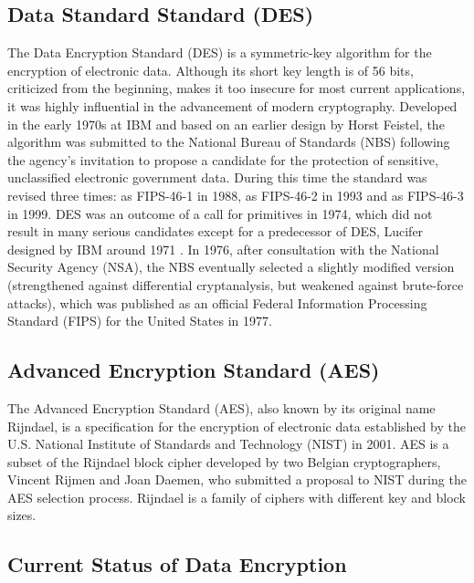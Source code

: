 \documentclass[journal]{IEEEtran}
\begin{document}
\subsection{\textbf{Data Standard Standard (DES)}}
The Data Encryption Standard (DES) is a symmetric-key algorithm for the encryption of electronic data. Although its short key length is of 56 bits, criticized from the beginning, makes it too insecure for most current applications, it was highly influential in the advancement of modern cryptography. Developed in the early 1970s at IBM and based on an earlier design by Horst Feistel, the algorithm was submitted to the National Bureau of Standards (NBS) following the agency's invitation to propose a candidate for the protection of sensitive, unclassified electronic government data. During this time the standard was revised three times: as FIPS-46-1 in 1988, as FIPS-46-2 in 1993 and as FIPS-46-3 in 1999. DES was an outcome of a call for primitives in 1974, which did not result in many serious candidates except for a predecessor of DES, Lucifer designed by IBM around 1971 \cite{DES}. In 1976, after consultation with the National Security Agency (NSA), the NBS eventually selected a slightly modified version (strengthened against differential cryptanalysis, but weakened against brute-force attacks), which was published as an official Federal Information Processing Standard (FIPS) for the United States in 1977.

\subsection{\textbf{Advanced Encryption Standard (AES)}}
The Advanced Encryption Standard (AES), also known by its original name Rijndael, is a specification for the encryption of electronic data established by the U.S. National Institute of Standards and Technology (NIST) in 2001. AES is a subset of the Rijndael block cipher developed by two Belgian cryptographers, Vincent Rijmen and Joan Daemen, who submitted a proposal to NIST during the AES selection process. Rijndael is a family of ciphers with different key and block sizes.

\subsection{\textbf{Current Status of Data Encryption}}
\end{document}
